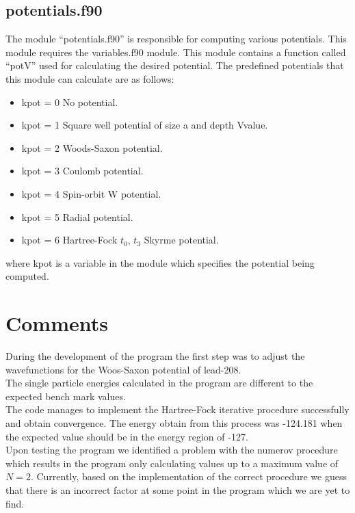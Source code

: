 \documentclass[11pt]{report}
\begin{document}
\section{potentials.f90}
The module ``potentials.f90'' is responsible for computing various potentials. This module requires the variables.f90 module. This module contains a function called ``potV'' used for calculating the desired potential. The predefined potentials that this module can calculate are as follows:
\begin{itemize}
\item kpot = 0 No potential.
\item kpot = 1 Square well potential of size a and depth Vvalue.
\item kpot = 2 Woods-Saxon potential. 
\item kpot = 3 Coulomb potential.
\item kpot = 4 Spin-orbit W potential.
\item kpot = 5 Radial potential.
\item kpot = 6 Hartree-Fock $t_{0}$, $t_{3}$ Skyrme potential. 
\end{itemize}
where kpot is a variable in the module which specifies the potential being computed.
\chapter{Comments}
During the development of the program the first step was to adjust the wavefunctions for the Woos-Saxon potential of lead-208. \\
The single particle energies calculated in the program are different to the expected bench mark values. \\
The code manages to implement the Hartree-Fock iterative procedure successfully and obtain convergence. The energy obtain from this process was -124.181 when the expected value should be in the energy region of -127. \\
Upon testing the program we identified a problem with the numerov procedure which results in the program only calculating values up to a maximum value of $N=2$. Currently, based on the implementation of the correct procedure we guess that there is an incorrect factor at some point in the program which we are yet to find.   
\end{document}
